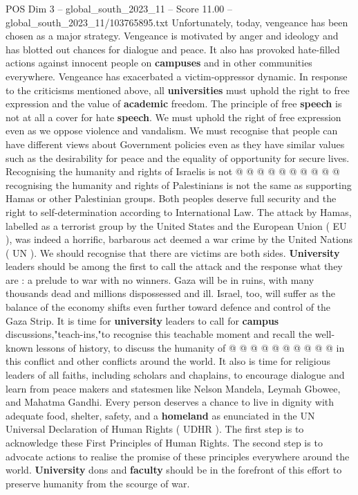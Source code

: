 \begin{textsample}{POS Dim 3 – global\_south\_2023\_11 – Score 11.00 – global\_south\_2023\_11/103765895.txt}
Unfortunately, today, vengeance has been chosen as a major strategy.
Vengeance is motivated by anger and ideology and has blotted out chances for dialogue and peace.
It also has provoked hate-filled actions against innocent people on \textbf{campuses} and in other communities everywhere.
Vengeance has exacerbated a victim-oppressor dynamic.
In response to the criticisms mentioned above, all \textbf{universities} must uphold the right to free expression and the value of \textbf{academic} freedom.
The principle of free \textbf{speech} is not at all a cover for hate \textbf{speech}.
We must uphold the right of free expression even as we oppose violence and vandalism.
We must recognise that people can have different views about Government policies even as they have similar values such as the desirability for peace and the equality of opportunity for secure lives.
Recognising the humanity and rights of Israelis is not @ @ @ @ @ @ @ @ @ @ recognising the humanity and rights of Palestinians is not the same as supporting Hamas or other Palestinian groups.
Both peoples deserve full security and the right to self-determination according to International Law.
The attack by Hamas, labelled as a terrorist group by the United States and the European Union ( EU ), was indeed a horrific, barbarous act deemed a war crime by the United Nations ( UN ).
We should recognise that there are victims are both sides. \textbf{University} leaders should be among the first to call the attack and the response what they are : a prelude to war with no winners.
Gaza will be in ruins, with many thousands dead and millions dispossessed and ill.
Israel, too, will suffer as the balance of the economy shifts even further toward defence and control of the Gaza Strip.
It is time for \textbf{university} leaders to call for \textbf{campus} discussions,"teach-ins,"to recognise this teachable moment and recall the well-known lessons of history, to discuss the humanity of @ @ @ @ @ @ @ @ @ @ in this conflict and other conflicts around the world.
It also is time for religious leaders of all faiths, including scholars and chaplains, to encourage dialogue and learn from peace makers and statesmen like Nelson Mandela, Leymah Gbowee, and Mahatma Gandhi.
Every person deserves a chance to live in dignity with adequate food, shelter, safety, and a \textbf{homeland} as enunciated in the UN Universal Declaration of Human Rights ( UDHR ).
The first step is to acknowledge these First Principles of Human Rights.
The second step is to advocate actions to realise the promise of these principles everywhere around the world. \textbf{University} dons and \textbf{faculty} should be in the forefront of this effort to preserve humanity from the scourge of war.

\end{textsample}
